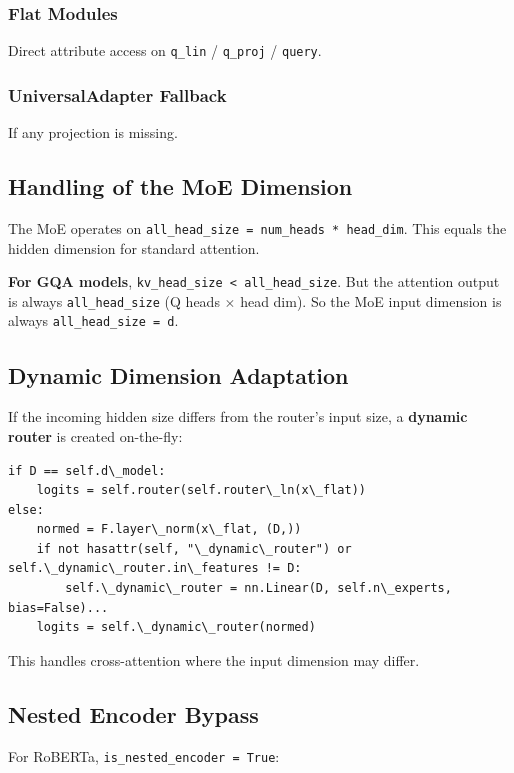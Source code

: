 \subsubsection{Flat Modules}

Direct attribute access on \texttt{q\_lin} / \texttt{q\_proj} / \texttt{query}.

\subsubsection{UniversalAdapter Fallback}

If any projection is missing.

\subsection{Handling of the MoE Dimension}

The MoE operates on \texttt{all\_head\_size = num\_heads * head\_dim}. This equals the 
hidden dimension for standard attention.

\textbf{For GQA models}, \texttt{kv\_head\_size \textless{} all\_head\_size}. But the attention output 
is always \texttt{all\_head\_size} (Q heads $\times$ head dim). So the MoE input dimension 
is always \texttt{all\_head\_size = d}.

\subsection{Dynamic Dimension Adaptation}

If the incoming hidden size differs from the router's input size, a 
\textbf{dynamic router} is created on-the-fly:

\begin{lstlisting}
if D == self.d\_model:
    logits = self.router(self.router\_ln(x\_flat))
else:
    normed = F.layer\_norm(x\_flat, (D,))
    if not hasattr(self, "\_dynamic\_router") or self.\_dynamic\_router.in\_features != D:
        self.\_dynamic\_router = nn.Linear(D, self.n\_experts, bias=False)...
    logits = self.\_dynamic\_router(normed)
\end{lstlisting}

This handles cross-attention where the input dimension may differ.

\subsection{Nested Encoder Bypass}

For RoBERTa, \texttt{is\_nested\_encoder = True}:

